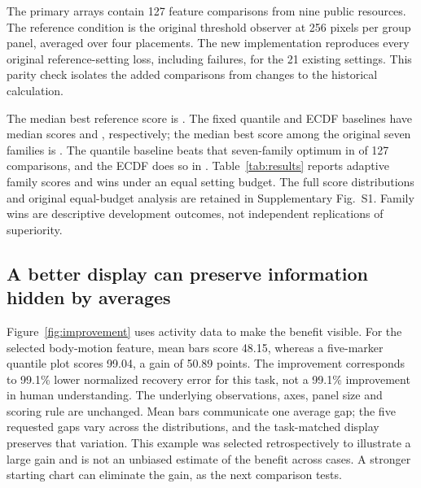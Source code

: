 \documentclass[11pt]{article}
\begin{document}
The primary arrays contain 127 feature comparisons from nine public resources.\cite{wdbc,heart,failure,kidney,liver,retina,har,bidmc,wrist} The reference condition is the original threshold observer at 256 pixels per group panel, averaged over four placements. The new implementation reproduces every original reference-setting loss, including failures, for the 21 existing settings. This parity check isolates the added comparisons from changes to the historical calculation.

The median best reference score is \BestMedian{}. The fixed quantile and ECDF baselines have median scores \QuantileMedian{} and \ECDFMedian{}, respectively; the median best score among the original seven families is \LegacyMedian{}. The quantile baseline beats that seven-family optimum in \QuantileBetter{} of 127 comparisons, and the ECDF does so in \ECDFBetter{}. Table~\ref{tab:results} reports adaptive family scores and wins under an equal setting budget. The full score distributions and original equal-budget analysis are retained in Supplementary Fig.~S1. Family wins are descriptive development outcomes, not independent replications of superiority.

\begin{table}[ht]\centering\small
\caption{\textbf{Reference results across 127 comparisons.} ``Wins'' permits all 23 settings; ``Fixed wins'' permits one setting per family. Median $S$ and group error $G$ use each family's best valid reference setting. Failed settings are excluded from selection, not assigned favorable values.}\label{tab:results}

\end{table}

\subsection*{A better display can preserve information hidden by averages}
Figure~\ref{fig:improvement} uses activity data to make the benefit visible. For the selected body-motion feature, mean bars score 48.15, whereas a five-marker quantile plot scores 99.04, a gain of 50.89 points. The improvement corresponds to 99.1\% lower normalized recovery error for this task, not a 99.1\% improvement in human understanding. The underlying observations, axes, panel size and scoring rule are unchanged. Mean bars communicate one average gap; the five requested gaps vary across the distributions, and the task-matched display preserves that variation. This example was selected retrospectively to illustrate a large gain and is not an unbiased estimate of the benefit across cases. A stronger starting chart can eliminate the gain, as the next comparison tests.
\end{document}
